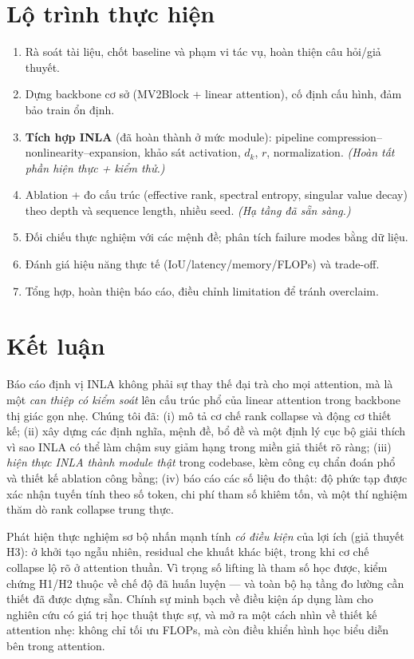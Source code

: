 \documentclass[12pt,a4paper]{article}
\begin{document}
\section{Lộ trình thực hiện}
\begin{enumerate}[leftmargin=*]
    \item Rà soát tài liệu, chốt baseline và phạm vi tác vụ, hoàn thiện câu hỏi/giả thuyết.
    \item Dựng backbone cơ sở (MV2Block + linear attention), cố định cấu hình, đảm bảo train ổn định.
    \item \textbf{Tích hợp INLA} (đã hoàn thành ở mức module): pipeline compression--nonlinearity--expansion,
    khảo sát activation, $d_k$, $r$, normalization. \emph{(Hoàn tất phần hiện thực + kiểm thử.)}
    \item Ablation + đo cấu trúc (effective rank, spectral entropy, singular value decay) theo depth
    và sequence length, nhiều seed. \emph{(Hạ tầng đã sẵn sàng.)}
    \item Đối chiếu thực nghiệm với các mệnh đề; phân tích failure modes bằng dữ liệu.
    \item Đánh giá hiệu năng thực tế (IoU/latency/memory/FLOPs) và trade-off.
    \item Tổng hợp, hoàn thiện báo cáo, điều chỉnh limitation để tránh overclaim.
\end{enumerate}

\section{Kết luận}

Báo cáo định vị INLA không phải sự thay thế đại trà cho mọi attention, mà là một \emph{can thiệp có
kiểm soát} lên cấu trúc phổ của linear attention trong backbone thị giác gọn nhẹ. Chúng tôi đã: (i)
mô tả cơ chế rank collapse và động cơ thiết kế; (ii) xây dựng các định nghĩa, mệnh đề, bổ đề và một
định lý cục bộ giải thích vì sao INLA có thể làm chậm suy giảm hạng trong miền giả thiết rõ ràng;
(iii) \emph{hiện thực INLA thành module thật} trong codebase, kèm công cụ chẩn đoán phổ và thiết kế
ablation công bằng; (iv) báo cáo các số liệu đo thật: độ phức tạp được xác nhận tuyến tính theo số
token, chi phí tham số khiêm tốn, và một thí nghiệm thăm dò rank collapse trung thực.

Phát hiện thực nghiệm sơ bộ nhấn mạnh tính \emph{có điều kiện} của lợi ích (giả thuyết H3): ở khởi
tạo ngẫu nhiên, residual che khuất khác biệt, trong khi cơ chế collapse lộ rõ ở attention thuần. Vì
trọng số lifting là tham số học được, kiểm chứng H1/H2 thuộc về chế độ đã huấn luyện --- và toàn bộ
hạ tầng đo lường cần thiết đã được dựng sẵn. Chính sự minh bạch về điều kiện áp dụng làm cho nghiên
cứu có giá trị học thuật thực sự, và mở ra một cách nhìn về thiết kế attention nhẹ: không chỉ tối ưu
FLOPs, mà còn điều khiển hình học biểu diễn bên trong attention.
\end{document}
